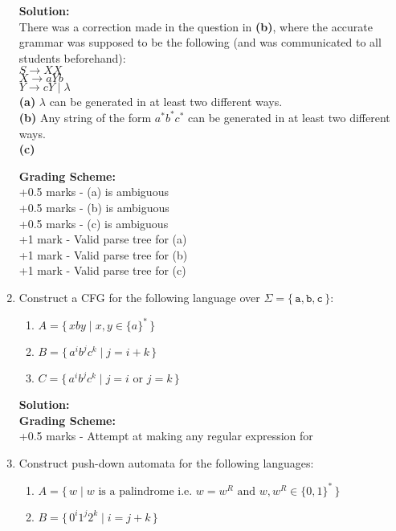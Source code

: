 \documentclass[11pt, article, oneside]{memoir}
\newcommand{\set}[1]{\{\, #1\, \}}
\begin{document}
\begin{enumerate}
        \textbf{Solution:}
        \\There was a correction made in the question in \textbf{(b)}, where the accurate grammar was supposed to be the following (and was communicated to all students beforehand):
        \\\textbf{\(S \rightarrow XX \)}
        \\\textbf{\(X \rightarrow aYb\)}
        \\\textbf{\(Y \rightarrow cY \mid \lambda\)}
        \\\textbf{(a)} \(\lambda\) can be generated in at least two different ways.
        \\\textbf{(b)} Any string of the form \(a^*b^*c^*\) can be generated in at least two different ways.
        \\\textbf{(c)} 
        

        \textbf{Grading Scheme:}
        \\+0.5 marks - (a) is ambiguous
        \\+0.5 marks - (b) is ambiguous
        \\+0.5 marks - (c) is ambiguous
        \\+1 mark - Valid parse tree for (a)
        \\+1 mark - Valid parse tree for (b)
        \\+1 mark - Valid parse tree for (c)
        
    \item
        Construct a CFG for the following language over \(\Sigma = \set{\texttt{a}, \texttt{b}, \texttt{c}}\):
        \begin{enumerate}
            \item
                \(A = \set{xby \mid x, y \in \{a\}^*}\) 
            \item
                \(B = \set{ {a^i}{b^j}{c^k} \mid j = i + k}\)
            \item
                \(C = \set{ {a^i}{b^j}{c^k} \mid j = i \text{ or } j = k}\)
        \end{enumerate}
                
        \textbf{Solution:}
        \\

        \textbf{Grading Scheme:}
        \\+0.5 marks - Attempt at making any regular expression for
        
    \item
        Construct push-down automata for the following languages:
        \begin{enumerate}
            \item
                \(A = \set{w \mid w \text{ is a palindrome i.e. } w = w^R \text{ and } w, w^R \in \{0, 1\}^*}\) 
            \item
                \(B = \set{ {0^i}{1^j}{2^k} \mid i = j + k}\)
        \end{enumerate}


\end{enumerate}
\end{document}
